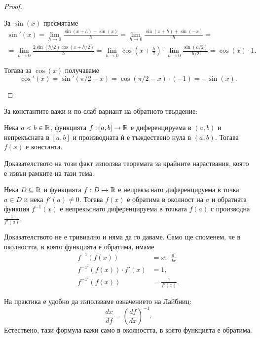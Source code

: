 \documentclass[numbers=endperiod, DIV=15, bibliography=totocnumbered]{scrartcl}
\begin{document}
\begin{proof}
\begin{enumerate}
    За $\sin(x)$ пресмятаме
    \begin{multline*}
      \sin'(x)
      =
      \lim_{h \to 0} \frac {\sin(x+h) - \sin(x)} h
      =
      \lim_{h \to 0} \frac {\sin(x+h) + \sin(-x)} h
      = \\ =
      \lim_{h \to 0} \frac {2 \sin(h / 2) \cos(x+h/2)} h
      =
      \lim_{h \to 0} \cos \left(x + \frac h 2 \right) \cdot \lim_{h \to 0} \frac {\sin(h / 2)} {h/2}
      =
      \cos(x) \cdot 1.
    \end{multline*}

    Тогава за $\cos(x)$ получаваме
    \begin{displaymath}
      \cos'(x) = \sin'(\pi / 2 - x) = \cos(\pi / 2 - x) \cdot (-1) = -\sin(x).
    \end{displaymath}
  \end{enumerate}
\end{proof}

За константите важи и по-слаб вариант на обратното твърдение:
\begin{proposition}\label{thm:zero-derivative}
  Нека $a < b \in \mathbb{R}$, функцията $f: [a, b] \to \mathbb{R}$ е диференцируема в $(a, b)$ и непрекъсната в $[a, b]$ и производната ѝ е тъждествено нула в $(a, b)$. Тогава $f(x)$ е константа.
\end{proposition}
\begin{note}
  Доказателството на този факт използва теоремата за крайните нараствания, която е извън рамките на тази тема.
\end{note}

\begin{theorem}
  Нека $D \subseteq \mathbb{R}$ и функцията $f: D \to \mathbb{R}$ е непрекъснато диференцируема в точка $a \in D$ и нека $f'(a) \neq 0$. Тогава $f(x)$ е обратима в околност на $a$ и обратната функция $f^{-1} (x)$ е непрекъснато диференцируема в точката $f(a)$ с производна $\frac 1 {f'(a)}$.
\end{theorem}
\begin{note}
  Доказателството не е тривиално и няма да го даваме. Само ще споменем, че в околността, в която функцията е обратима, имаме
  \begin{align*}
    f^{-1}(f(x)) &= x, \mid \frac d {dx}
    \\
    f^{-1'}(f(x)) \cdot f'(x) &= 1,
    \\
    f^{-1'}(f(x)) &= \frac 1 {f'(x)}.
  \end{align*}

  На практика е удобно да използваме означението на Лайбниц:
  \begin{displaymath}
    \frac {dx} {df} = {\left( \frac {df} {dx} \right)}^{-1}.
  \end{displaymath}
  Естествено, тази формула важи само в околността, в която функцията е обратима.
\end{note}
\end{document}
